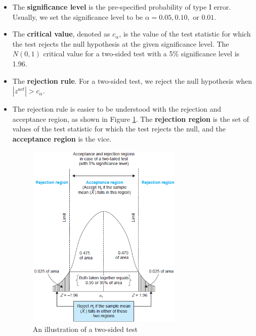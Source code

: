 \documentclass[a4paper,11pt]{article}
\begin{document}
\begin{itemize}
\item The \textbf{significance level} is the pre-specified probability of type I error.
Usually, we set the significance level to be \(\alpha = 0.05, 0.10,
  \text{ or } 0.01\).

\item The \textbf{critical value}, denoted as \(c_{\alpha}\), is the value of the test statistic for which
the test rejects the null hypothesis at the given significance
level. The \(N(0, 1)\) critical value for a two-sided test with a 5\%
significance level is 1.96.

\item The \textbf{rejection rule}.  For a two-sided test, we reject the null
hypothesis when \(|z^{act}| > c_{\alpha}\).

\item The rejection rule is easier to be understood with the rejection and
acceptance region, as shown in Figure \ref{fig:orgc6283cd}. The
\textbf{rejection region} is the set of values of the test statistic for
which the test rejects the null, and the \textbf{acceptance region} is the
vice.

\begin{figure}[htbp]
\centering
\includegraphics[width=0.7\textwidth]{figure/fig9_1.png}
\caption{\label{fig:orgc6283cd}
An illustration of a two-sided test}
\end{figure}
\end{itemize}
\end{document}
